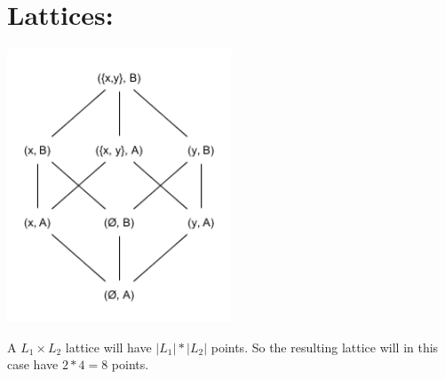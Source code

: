 \documentclass{article}
\begin{document}
\section*{Lattices:}
\includegraphics[width=0.5\textwidth]{Lattices}

\noindent A $L_1 \times L_2$ lattice will have $|L_1| * |L_2|$ points. So the resulting lattice will in this case have $2 * 4 = 8$ points.
\end{document}
